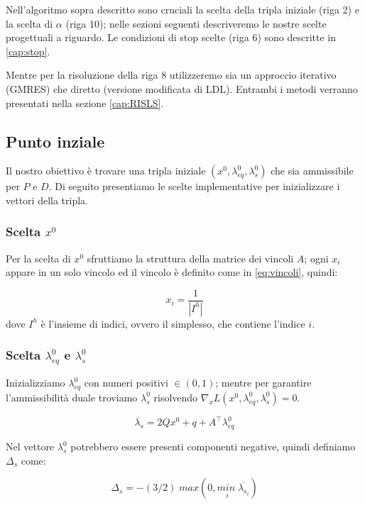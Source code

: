 Nell'algoritmo sopra descritto sono cruciali la scelta della tripla iniziale (riga 2) e la scelta di $\alpha$ (riga 10); nelle sezioni seguenti descriveremo le nostre scelte progettuali a riguardo.
Le condizioni di stop scelte (riga 6) sono descritte in \ref{cap:stop}.

Mentre per la risoluzione della riga 8 utilizzeremo sia un approccio iterativo (GMRES) che diretto (versione modificata di LDL).
Entrambi i metodi verranno presentati nella sezione \ref{cap:RISLS}.

\subsection{Punto inziale}\label{cap:sp}
Il nostro obiettivo è trovare una tripla iniziale $(x^0, \lambda_{eq}^0, \lambda_s^0)$ che sia ammissibile per $P$ e $D$.
Di seguito presentiamo le scelte implementative per inizializzare i vettori della tripla.

\subsubsection*{Scelta $x^0$}
Per la scelta di $x^0$ sfruttiamo la struttura della matrice dei vincoli $A$; ogni $x_i$ appare in un solo vincolo ed il vincolo è definito come in \ref{eq:vincoli}, quindi: 

\begin{equation}\label{eq:startx}
  x_i=\frac{1}{|I^h|}  
\end{equation}
dove $I^h$ è l'insieme di indici, ovvero il simplesso, che contiene l'indice $i$.

\subsubsection*{Scelta $\lambda^0_{eq}$ e $\lambda^0_{s}$}
Inizializziamo $\lambda^0_{eq}$ con numeri positivi $\in (0,1)$; mentre per garantire l'ammissibilità duale troviamo $\lambda^0_s$ risolvendo 
$\nabla _x L(x^0, \lambda_{eq}^0, \lambda_s^0) = 0$.

\begin{equation}\label{eq:startl}
\overline{\lambda_s} = 2Qx^0+q+A^\intercal\lambda_{eq}^0
\end{equation}

Nel vettore $\lambda_s^0$ potrebbero essere presenti componenti negative, quindi definiamo $\Delta_s$ come:

\begin{equation}\label{eq:startdl}
\Delta_s = -(3/2)\;max(0, \underset{i}{min\;}\overline{\lambda_{s_i}})
\end{equation}

